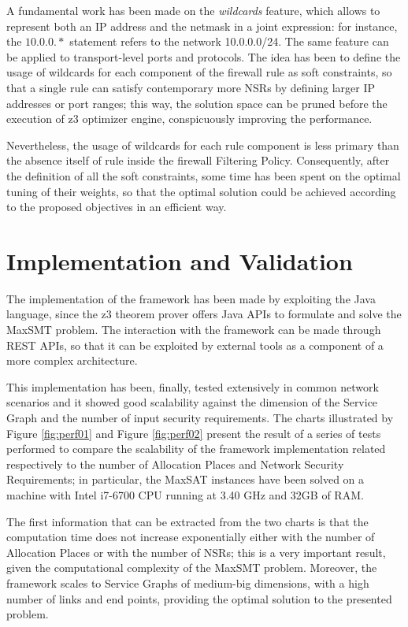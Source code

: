 \documentclass[10pt,a4paper,roman, twocolumn]{article}
\begin{document}
A fundamental work has been made on the \textit{wildcards} feature, which allows to represent both an IP address and the netmask in a joint expression: for instance, the $10.0.0.\ast$ statement refers to the network 10.0.0.0/24. The same feature can be applied to transport-level ports and protocols. The idea has been to define the usage of wildcards for each component of the firewall rule as soft constraints, so that a single rule can satisfy contemporary more NSRs by defining larger IP addresses or port  ranges; this way, the solution space can be pruned before the execution of z3 optimizer engine, conspicuously improving the performance. 

Nevertheless, the usage of wildcards for each rule component is less primary than the absence itself of rule inside the firewall Filtering Policy. Consequently, after the definition of all the soft constraints, some time has been spent on the optimal tuning of their weights, so that the optimal solution could be achieved according to the proposed objectives in an efficient way.

\section{Implementation and Validation}

The implementation of the framework has been made by exploiting the Java language, since the z3 theorem prover offers Java APIs to formulate and solve the MaxSMT problem. The interaction with the framework can be made through REST APIs, so that it can be exploited by external tools as a component of a more complex architecture.

This implementation has been, finally, tested extensively in common network scenarios and it showed good scalability against the dimension of the Service Graph and the number of input security requirements. The charts illustrated by Figure \ref{fig:perf01} and Figure \ref{fig:perf02} present the result of a series of tests performed to compare the scalability of the framework implementation related respectively to the number of Allocation Places and Network Security Requirements; in particular, the MaxSAT instances have been solved on a machine with Intel i7-6700 CPU running at 3.40 GHz and
32GB of RAM. 

The first information that can be extracted from the two charts is that the computation time does not increase exponentially either with the number of Allocation Places or with the number of NSRs; this is a very important result, given the computational complexity of the MaxSMT problem. Moreover, the framework scales to Service Graphs of medium-big dimensions, with a high number of links and end points, providing the optimal solution to the presented problem.
\end{document}
